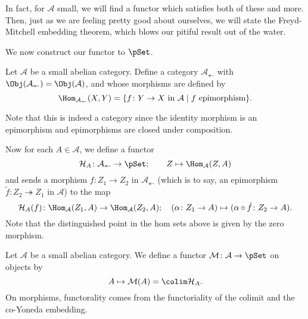 \documentclass[main.tex]{subfiles}
\begin{document}
In fact, for $\mathcal{A}$ small, we will find a functor which satisfies both of these and more. Then, just as we are feeling pretty good about ourselves, we will state the Freyd-Mitchell embedding theorem, which blows our pitiful result out of the water.

We now construct our functor to $\pSet$.

\begin{definition}
  \label{def:category_of_contravariant_epimorphisms}
  Let $\mathcal{A}$ be a small abelian category. Define a category $\mathcal{A}_{\twoheadleftarrow}$ with $\Obj(\mathcal{A}_{\twoheadleftarrow}) = \Obj(\mathcal{A})$, and whose morphisms are defined by
  \begin{equation*}
    \Hom_{\mathcal{A}_{\twoheadleftarrow}}(X, Y) = \{f\colon Y \to X \text{ in }\mathcal{A}\mid f \text{ epimorphism}\}.
  \end{equation*}
\end{definition}

Note that this is indeed a category since the identity morphism is an epimorphism and epimorphisms are closed under composition.

Now for each $A \in \mathcal{A}$, we define a functor
\begin{equation*}
  \mathcal{H}_{A}\colon \mathcal{A}_{\twoheadleftarrow} \to \pSet;\qquad Z \mapsto \Hom_{\mathcal{A}}(Z, A)
\end{equation*}
and sends a morphism $f\colon Z_{1} \to Z_{2}$ in $\mathcal{A}_{\twoheadleftarrow}$ (which is to say, an epimorphism $\tilde{f}\colon Z_{2} \twoheadrightarrow Z_{1}$ in $\mathcal{A}$) to the map
\begin{equation*}
  \mathcal{H}_{A}(f)\colon \Hom_{\mathcal{A}}(Z_{1}, A) \to \Hom_{\mathcal{A}}(Z_{2}, A);\quad (\alpha\colon Z_{1} \to A) \mapsto (\alpha \circ \tilde{f}\colon Z_{2} \to A).
\end{equation*}
Note that the distinguished point in the hom sets above is given by the zero morphism.

\begin{definition}
  \label{def:member_functor}
  Let $\mathcal{A}$ be a small abelian category. We define a functor $\mathcal{M}\colon \mathcal{A} \to \pSet$ on objects by
  \begin{equation*}
    A \mapsto \mathcal{M}(A) = \colim \mathcal{H}_{A}.
  \end{equation*}
  On morphisms, functorality comes from the functoriality of the colimit and the co-Yoneda embedding.
\end{definition}
\end{document}
